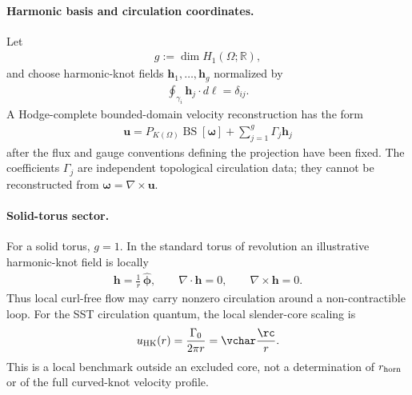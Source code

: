     \paragraph{Harmonic basis and circulation coordinates.}
    Let
    \begin{align}
        g
        :=
        \dim H_1(\Omega;\mathbb R),
    \end{align}
    and choose harmonic-knot fields \(\mathbf h_1,\ldots,\mathbf h_g\) normalized by
    \begin{align}
        \oint_{\gamma_i}\mathbf h_j\cdot d\boldsymbol\ell
        =
        \delta_{ij}.
        \label{eq:rt_harmonic_basis_normalization}
    \end{align}
    A Hodge-complete bounded-domain velocity reconstruction has the form
    \begin{align}
        \boxed{
        \mathbf u
        =
        P_{K(\Omega)}\operatorname{BS}[\boldsymbol\omega]
        +
        \sum_{j=1}^{g}\Gamma_j\mathbf h_j
        }
        \label{eq:rt_hodge_complete_velocity}
    \end{align}
    after the flux and gauge conventions defining the projection have been fixed.
    The coefficients \(\Gamma_j\) are independent topological circulation data; they
    cannot be reconstructed from \(\boldsymbol\omega=\nabla\times\mathbf u\).

    \paragraph{Solid-torus sector.}
    For a solid torus, \(g=1\).  In the standard torus of revolution an illustrative
    harmonic-knot field is locally
    \begin{align}
        \mathbf h
        =
        \frac{1}{r}\,\widehat{\boldsymbol\phi},
        \qquad
        \nabla\cdot\mathbf h=0,
        \qquad
        \nabla\times\mathbf h=0.
        \label{eq:rt_solid_torus_harmonic_field}
    \end{align}
    Thus local curl-free flow may carry nonzero circulation around a non-contractible
    loop.  For the SST circulation quantum, the local slender-core scaling is
    \begin{align}
        u_{\rm HK}(r)
        =
        \frac{\Gamma_0}{2\pi r}
        =
        \vchar\frac{\rc}{r}.
        \label{eq:rt_harmonic_circulation_scaling}
    \end{align}
    This is a local benchmark outside an excluded core, not a determination of
    \(r_{\rm horn}\) or of the full curved-knot velocity profile.

